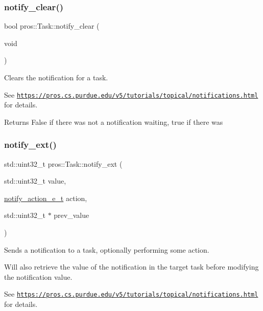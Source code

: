 \subsubsection{\texorpdfstring{notify\+\_\+clear()}{notify\_clear()}}
{\footnotesize\ttfamily bool pros\+::\+Task\+::notify\+\_\+clear (\begin{DoxyParamCaption}\item[{void}]{ }\end{DoxyParamCaption})}



Clears the notification for a task. 

See \href{https://pros.cs.purdue.edu/v5/tutorials/topical/notifications.html}{\tt https\+://pros.\+cs.\+purdue.\+edu/v5/tutorials/topical/notifications.\+html} for details.

\begin{DoxyReturn}{Returns}
False if there was not a notification waiting, true if there was 
\end{DoxyReturn}
\mbox{\label{classpros_1_1Task_add5bc6272aaa903fdf8ae6656d8ffddb}} 
\subsubsection{\texorpdfstring{notify\+\_\+ext()}{notify\_ext()}}
{\footnotesize\ttfamily std\+::uint32\+\_\+t pros\+::\+Task\+::notify\+\_\+ext (\begin{DoxyParamCaption}\item[{std\+::uint32\+\_\+t}]{value,  }\item[{\hyperlink{rtos_8h_a42ea99b5e5d38da0b98154609cf6c570}{notify\+\_\+action\+\_\+e\+\_\+t}}]{action,  }\item[{std\+::uint32\+\_\+t $\ast$}]{prev\+\_\+value }\end{DoxyParamCaption})}



Sends a notification to a task, optionally performing some action. 

Will also retrieve the value of the notification in the target task before modifying the notification value.

See \href{https://pros.cs.purdue.edu/v5/tutorials/topical/notifications.html}{\tt https\+://pros.\+cs.\+purdue.\+edu/v5/tutorials/topical/notifications.\+html} for details.


